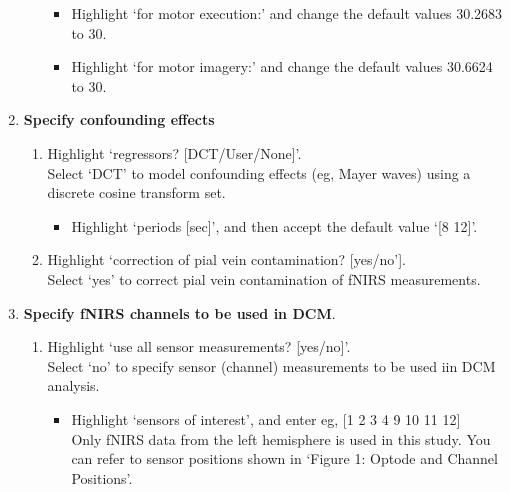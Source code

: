 \begin{enumerate}
\begin{enumerate}
\begin{itemize} 
\item Highlight `for motor execution:' and change the default values 30.2683 to 30. 
\item Highlight `for motor imagery:' and change the default values 30.6624 to 30. 
\end{itemize}
\end{enumerate}
\item \textbf{Specify confounding effects}
\begin{enumerate}
\item Highlight `regressors? [DCT/User/None]'. \\ Select `DCT' to model confounding effects (eg, Mayer waves) using a discrete cosine transform set. 
\begin{itemize}
\item Highlight `periods [sec]', and then accept the default value `[8 12]'. 
\end{itemize}
\item Highlight `correction of pial vein contamination? [yes/no'].\\ Select `yes' to correct pial vein contamination of fNIRS measurements.
\end{enumerate}
\newpage
\item \textbf{Specify fNIRS channels to be used in DCM}.
\begin{enumerate}
\item Highlight `use all sensor measurements? [yes/no]'.\\Select `no' to specify sensor (channel) measurements to be used iin DCM analysis. 
\begin{itemize}
\item Highlight `sensors of interest', and enter eg, [1 2 3 4 9 10 11 12] \\Only fNIRS data from the left hemisphere is used in this study. You can refer to sensor positions shown in `Figure 1: Optode and Channel Positions'.
\end{itemize}
\end{enumerate}


\end{enumerate}
